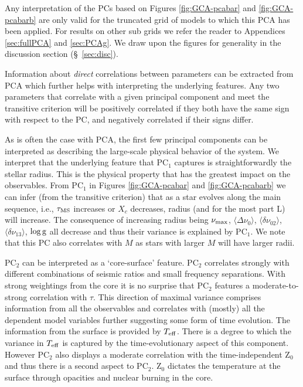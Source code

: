Any interpretation of the PCs based on Figures \ref{fig:GCA-pcabar} and \ref{fig:GCA-pcabarb} are only valid for the truncated grid of models to which this PCA has been applied. For results on other sub grids we refer the reader to Appendices \ref{sec:fullPCA} and \ref{sec:PCAg}. 
We draw upon the figures for generality in the discussion section (\S~\ref{sec:disc}).


Information about \emph{direct} correlations between parameters can be extracted from PCA which further helps with interpreting the underlying features.
Any two parameters that correlate with a given principal component and meet the transitive criterion will be positively correlated if they both have the same sign with respect to the PC, and negatively correlated if their signs differ. 

As is often the case with PCA, the first few principal components can be interpreted as describing the large-scale physical behavior of the system.
We interpret that the underlying feature that PC$_1$ captures is straightforwardly the stellar radius.  
This is the physical property that has the greatest impact on the observables.
From PC$_1$ in Figures \ref{fig:GCA-pcabar} and \ref{fig:GCA-pcabarb} we can infer (from the transitive criterion) that as a star evolves along the main sequence, i.e., $\tau_{\rm{MS}}$ increases or $X_c$ decreases, radius (and for the most part L) will increase.  
The consequence of increasing radius being $\nu_{\rm{max}}$, 
$\langle\Delta\nu_0\rangle$,
$\langle\delta\nu_{02}\rangle$, 
$\langle\delta\nu_{13}\rangle$,
 $\log \rm{g}$ all decrease and thus their variance is explained by PC$_1$. 
We note that this PC also correlates with $M$ as stars with larger $M$ will have larger radii.  


PC$_2$ can be interpreted as a `core-surface' feature.
PC$_2$ correlates strongly with different combinations of seismic ratios and small frequency separations. %
With strong weightings from the core it is no surprise that PC$_2$ features a moderate-to-strong correlation with $\tau$.  
This direction of maximal variance comprises information from all the observables and correlates with (mostly) all the dependent model variables further suggesting some form of time evolution. 
The information from the surface is provided by $T_{\rm{eff}}$.  
There is a degree to which the variance in $T_{\rm{eff}}$ is captured by the time-evolutionary aspect of this component. 
However PC$_2$ also displays a moderate correlation with the time-independent Z$_0$ and thus there is a second aspect to  PC$_2$.
Z$_0$ dictates the temperature at the surface through opacities and nuclear burning in the core.

